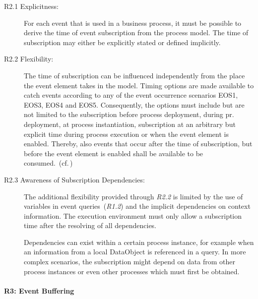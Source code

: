 \begin{description}
	\item[R2.1 Explicitness:] 
	For each event that is used in a business process, it must be possible to derive the time of event subscription from the process model. The time of subscription may either be explicitly stated or defined implicitly.
	\item[R2.2 Flexibility:] 
	The time of subscription can be influenced independently from the place the event element takes in the model. Timing options are made available to catch events according to any of the event occurrence scenarios EOS1, EOS3, EOS4 and EOS5. 
	Consequently, the options must include but are not limited to the subscription before process deployment, during  pr. deployment, at process instantiation, subscription at an arbitrary but explicit time during process execution or when the event element is enabled.
	Thereby, also events that occur after the time of subscription, but before the event element is enabled shall be available to be consumed.~(cf.\,\cite{mandal:2017})
	\item[R2.3 Awareness of Subscription Dependencies:]
	The additional flexibility provided through \textit{R2.2} is limited by the use of variables in event queries~(\textit{R1.2}) and the implicit dependencies on context information.
	The execution environment must only allow a subscription time after the resolving of all dependencies.
	
	Dependencies can exist within a certain process instance, for example when an information from a local DataObject is referenced in a query. In more complex scenarios, the subscription might depend on data from other process instances or even other processes which must first be obtained.
\end{description}


\paragraph{R3: Event Buffering}

